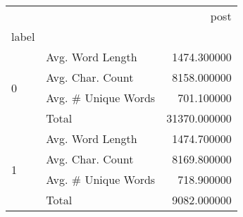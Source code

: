 \begin{tabular}{llr}
\toprule
 &  & post \\
label &  &  \\
\midrule
\multirow[t]{4}{*}{0} & Avg. Word Length & 1474.300000 \\
 & Avg. Char. Count & 8158.000000 \\
 & Avg. # Unique Words & 701.100000 \\
 & Total & 31370.000000 \\
\cline{1-3}
\multirow[t]{4}{*}{1} & Avg. Word Length & 1474.700000 \\
 & Avg. Char. Count & 8169.800000 \\
 & Avg. # Unique Words & 718.900000 \\
 & Total & 9082.000000 \\
\cline{1-3}
\bottomrule
\end{tabular}
